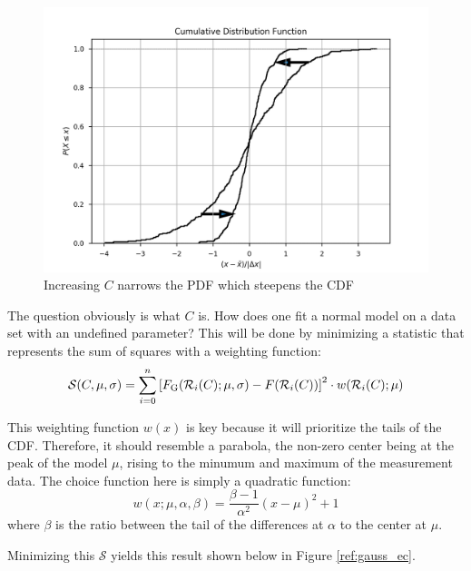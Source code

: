 \documentclass[12pt, a4paper]{article}
\begin{document}
\begin{figure}[H]
\centering
\includegraphics[width=\textwidth]{err_cor1}
\caption{Increasing $C$ narrows the PDF which steepens the CDF}
\label{fig:err_cor1}
\end{figure}

The question obviously is what $C$ is. How does one fit a normal model on a data set with an undefined parameter?
This will be done by minimizing a statistic that represents the sum of squares with a weighting function:
\[
\mathcal{S}(C, \mu, \sigma) = \sum_{i=0}^{n}
\bqty{F_\mathrm{G} (\mathcal{R}_i(C); \mu, \sigma)
  -F(\mathcal{R}_i(C))}^2
\cdot w(\mathcal{R}_i(C); \mu)
\]

This weighting function $w(x)$ is key because it will prioritize the tails of the CDF.
Therefore, it should resemble a parabola, the non-zero center being at the peak of the model $\mu$, rising to the minumum and maximum of the measurement data.
The choice function here is simply a quadratic function:
\[
w(x;\mu, \alpha, \beta)
= \frac{\beta -1}{\alpha ^2}(x-\mu)^2 + 1
\]
where $\beta$ is the ratio between the tail of the differences at $\alpha$ to the center at $\mu$.

Minimizing this $\mathcal{S}$ yields this result shown below in Figure \ref{ref:gauss_ec}.
\end{document}
